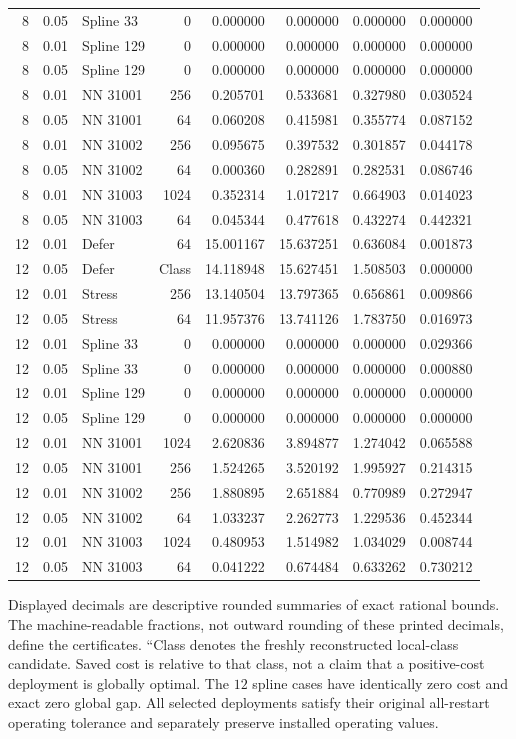 \begin{longtable}{rrlrrrrr}
8 & 0.05 & Spline 33 & 0 & 0.000000 & 0.000000 & 0.000000 & 0.000000 \\
8 & 0.01 & Spline 129 & 0 & 0.000000 & 0.000000 & 0.000000 & 0.000000 \\
8 & 0.05 & Spline 129 & 0 & 0.000000 & 0.000000 & 0.000000 & 0.000000 \\
8 & 0.01 & NN 31001 & 256 & 0.205701 & 0.533681 & 0.327980 & 0.030524 \\
8 & 0.05 & NN 31001 & 64 & 0.060208 & 0.415981 & 0.355774 & 0.087152 \\
8 & 0.01 & NN 31002 & 256 & 0.095675 & 0.397532 & 0.301857 & 0.044178 \\
8 & 0.05 & NN 31002 & 64 & 0.000360 & 0.282891 & 0.282531 & 0.086746 \\
8 & 0.01 & NN 31003 & 1024 & 0.352314 & 1.017217 & 0.664903 & 0.014023 \\
8 & 0.05 & NN 31003 & 64 & 0.045344 & 0.477618 & 0.432274 & 0.442321 \\
12 & 0.01 & Defer & 64 & 15.001167 & 15.637251 & 0.636084 & 0.001873 \\
12 & 0.05 & Defer & Class & 14.118948 & 15.627451 & 1.508503 & 0.000000 \\
12 & 0.01 & Stress & 256 & 13.140504 & 13.797365 & 0.656861 & 0.009866 \\
12 & 0.05 & Stress & 64 & 11.957376 & 13.741126 & 1.783750 & 0.016973 \\
12 & 0.01 & Spline 33 & 0 & 0.000000 & 0.000000 & 0.000000 & 0.029366 \\
12 & 0.05 & Spline 33 & 0 & 0.000000 & 0.000000 & 0.000000 & 0.000880 \\
12 & 0.01 & Spline 129 & 0 & 0.000000 & 0.000000 & 0.000000 & 0.000000 \\
12 & 0.05 & Spline 129 & 0 & 0.000000 & 0.000000 & 0.000000 & 0.000000 \\
12 & 0.01 & NN 31001 & 1024 & 2.620836 & 3.894877 & 1.274042 & 0.065588 \\
12 & 0.05 & NN 31001 & 256 & 1.524265 & 3.520192 & 1.995927 & 0.214315 \\
12 & 0.01 & NN 31002 & 256 & 1.880895 & 2.651884 & 0.770989 & 0.272947 \\
12 & 0.05 & NN 31002 & 64 & 1.033237 & 2.262773 & 1.229536 & 0.452344 \\
12 & 0.01 & NN 31003 & 1024 & 0.480953 & 1.514982 & 1.034029 & 0.008744 \\
12 & 0.05 & NN 31003 & 64 & 0.041222 & 0.674484 & 0.633262 & 0.730212 \\
\bottomrule
\end{longtable}
\endgroup
Displayed decimals are descriptive rounded summaries of exact rational bounds. The machine-readable fractions, not outward rounding of these printed decimals, define the certificates. ``Class denotes the freshly reconstructed local-class candidate. Saved cost is relative to that class, not a claim that a positive-cost deployment is globally optimal. The $12$ spline cases have identically zero cost and exact zero global gap. All selected deployments satisfy their original all-restart operating tolerance and separately preserve installed operating values.
